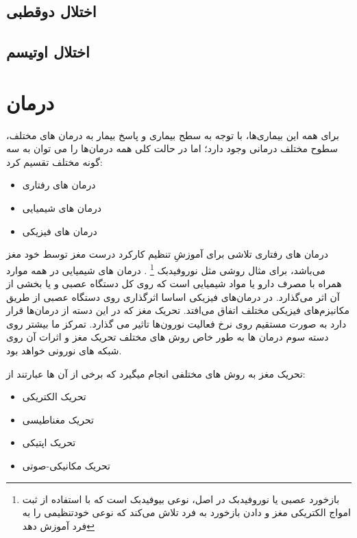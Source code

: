 \subsection{اختلال دوقطبی}
\subsection{اختلال اوتیسم}

\section{درمان}
برای همه این بیماری‌ها، با توجه به سطح بیماری و پاسخ بیمار به درمان های مختلف، سطوح مختلف درمانی وجود دارد؛ اما در حالت کلی همه درمان‌ها را می توان به سه گونه مختلف تقسیم کرد:
\begin{itemize}
  \item درمان های رفتاری
  \item درمان های شیمیایی
  \item درمان های فیزیکی
\end{itemize}
درمان های رفتاری تلاشی برای آموزشِ تنظیم کارکرد درست مغز توسط خود مغز می‌باشد، برای مثال روشی مثل نوروفیدبک
\footnote{بازخورد عصبی یا نوروفیدبک در اصل، نوعی بیوفیدبک است که با استفاده از ثبت امواج الکتریکی مغز و دادن بازخورد به فرد تلاش می‌کند که نوعی خودتنظیمی را به فرد آموزش دهد}
.
درمان های شیمیایی در همه موارد همراه با مصرف دارو یا مواد شیمیایی است که روی کل دستگاه عصبی و یا بخشی از آن اثر می‌گذارد. در درمان‌های فیزیکی اساسا اثرگذاری روی دستگاه عصبی از طریق مکانیزم‌های فیزیکی مختلف اتفاق می‌افتد. تحریک مغز که در این دسته از درمان‌ها قرار دارد به صورت مستقیم روی نرخ فعالیت نورون‌ها تاثیر می گذارد. تمرکز ما بیشتر روی دسته سوم درمان ها  به طور خاص روش های مختلف تحریک مغز و اثرات آن روی شبکه های نورونی خواهد بود.


تحریک مغز به روش های مختلفی انجام میگیرد که برخی از آن ها عبارتند از:
\begin{itemize}
  \item تحریک الکتریکی
  \item تحریک مغناطیسی
  \item تحریک اپتیکی
  \item تحریک مکانیکی-صوتی
\end{itemize}
